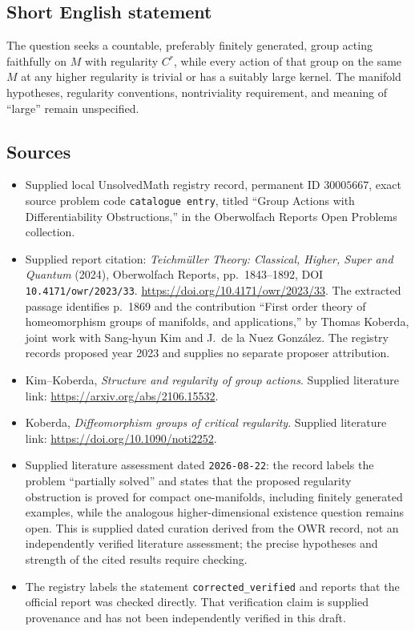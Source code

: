 \documentclass[11pt]{article}
\begin{document}
\subsection{Short English statement}
The question seeks a countable, preferably finitely generated, group acting faithfully on \(M\) with regularity \(C^r\), while every action of that group on the same \(M\) at any higher regularity is trivial or has a suitably large kernel. The manifold hypotheses, regularity conventions, nontriviality requirement, and meaning of ``large'' remain unspecified.
\subsection{Sources}
\begin{itemize}
\item Supplied local UnsolvedMath registry record, permanent ID \(30005667\), exact source problem code \texttt{catalogue entry}, titled ``Group Actions with Differentiability Obstructions,'' in the Oberwolfach Reports Open Problems collection.
\item Supplied report citation: \emph{Teichm\"uller Theory: Classical, Higher, Super and Quantum} (2024), Oberwolfach Reports, pp.\ 1843--1892, DOI \texttt{10.4171/owr/2023/33}. \url{https://doi.org/10.4171/owr/2023/33}. The extracted passage identifies p.\ 1869 and the contribution ``First order theory of homeomorphism groups of manifolds, and applications,'' by Thomas Koberda, joint work with Sang-hyun Kim and J.\ de la Nuez Gonz\'alez. The registry records proposed year 2023 and supplies no separate proposer attribution.
\item Kim--Koberda, \emph{Structure and regularity of group actions}. Supplied literature link: \url{https://arxiv.org/abs/2106.15532}.
\item Koberda, \emph{Diffeomorphism groups of critical regularity}. Supplied literature link: \url{https://doi.org/10.1090/noti2252}.
\item Supplied literature assessment dated \texttt{2026-08-22}: the record labels the problem ``partially solved'' and states that the proposed regularity obstruction is proved for compact one-manifolds, including finitely generated examples, while the analogous higher-dimensional existence question remains open. This is supplied dated curation derived from the OWR record, not an independently verified literature assessment; the precise hypotheses and strength of the cited results require checking.
\item The registry labels the statement \texttt{corrected\_verified} and reports that the official report was checked directly. That verification claim is supplied provenance and has not been independently verified in this draft.
\end{itemize}
\end{document}
